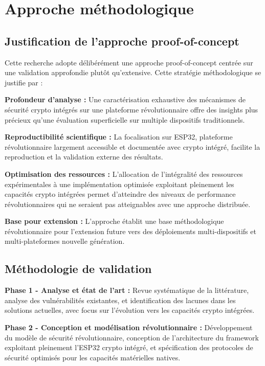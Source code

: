 \section{Approche méthodologique}

\subsection{Justification de l'approche proof-of-concept}

Cette recherche adopte délibérément une approche proof-of-concept centrée sur une validation approfondie plutôt qu'extensive. Cette stratégie méthodologique se justifie par :

\textbf{Profondeur d'analyse :} Une caractérisation exhaustive des mécanismes de sécurité crypto intégrés sur une plateforme révolutionnaire offre des insights plus précieux qu'une évaluation superficielle sur multiple dispositifs traditionnels.

\textbf{Reproductibilité scientifique :} La focalisation sur ESP32, plateforme révolutionnaire largement accessible et documentée avec crypto intégré, facilite la reproduction et la validation externe des résultats.

\textbf{Optimisation des ressources :} L'allocation de l'intégralité des ressources expérimentales à une implémentation optimisée exploitant pleinement les capacités crypto intégrées permet d'atteindre des niveaux de performance révolutionnaires qui ne seraient pas atteignables avec une approche distribuée.

\textbf{Base pour extension :} L'approche établit une base méthodologique révolutionnaire pour l'extension future vers des déploiements multi-dispositifs et multi-plateformes nouvelle génération.

\subsection{Méthodologie de validation}

\textbf{Phase 1 - Analyse et état de l'art :} Revue systématique de la littérature, analyse des vulnérabilités existantes, et identification des lacunes dans les solutions actuelles, avec focus sur l'évolution vers les capacités crypto intégrées.

\textbf{Phase 2 - Conception et modélisation révolutionnaire :} Développement du modèle de sécurité révolutionnaire, conception de l'architecture du framework exploitant pleinement l'ESP32 crypto intégré, et spécification des protocoles de sécurité optimisés pour les capacités matérielles natives.

